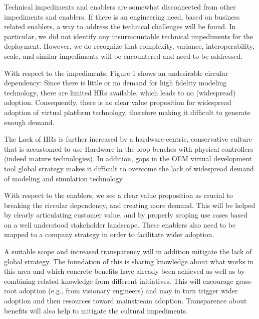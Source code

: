 Technical impediments and enablers are somewhat disconnected from other impediments and enablers. If there is an engineering need, based on business related enablers, a way to address the technical challenges will be found. In particular, we did not identify any insurmountable technical impediments for the deployment. However, we do recognize that complexity, variance, interoperability, scale, and similar impediments will be encountered and need to be addressed.

With respect to the impediments, Figure 1 shows an undesirable circular dependency: Since there is little or no demand for high fidelity modeling technology, there are limited HRs available, which leads to no (widespread) adoption. Consequently, there is no clear value proposition for widespread adoption of virtual platform technology, therefore making it difficult to generate enough demand.

The Lack of HRs is further increased by a hardware-centric, conservative culture that is accustomed to use Hardware in the loop benches with physical controllers (indeed mature technologies). In addition, gaps in the OEM virtual development tool global strategy makes it difficult to overcome the lack of widespread demand of modeling and simulation technology

With respect to the enablers, we see a clear value proposition as crucial to breaking the circular dependency, and creating more demand. This will be helped by clearly articulating customer value, and by properly scoping use cases based on a well understood stakeholder landscape. These enablers also need to be mapped to a company strategy in order to facilitate wider adoption. 

A suitable scope and increased transparency will in addition mitigate the lack of global strategy. The foundation of this is sharing knowledge about what works in this area and which concrete benefits have already been achieved as well as by combining related knowledge from different initiatives. This will encourage grass-root adoption (e.g., from visionary engineers) and may in turn trigger wider adoption and then resources toward mainstream adoption. Transparence about benefits will also help to mitigate the cultural impediments.